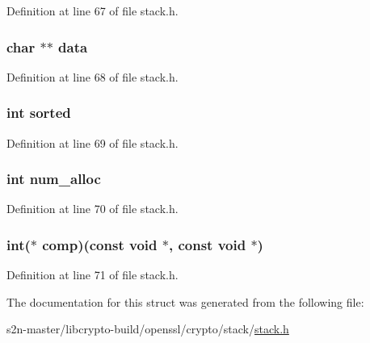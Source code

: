 Definition at line 67 of file stack.\+h.

\subsubsection[{\texorpdfstring{data}{data}}]{\setlength{\rightskip}{0pt plus 5cm}char $\ast$$\ast$ data}\hypertarget{structstack__st_a4abb3a814e075556aea26c8a8e63ea79}{}\label{structstack__st_a4abb3a814e075556aea26c8a8e63ea79}


Definition at line 68 of file stack.\+h.

\subsubsection[{\texorpdfstring{sorted}{sorted}}]{\setlength{\rightskip}{0pt plus 5cm}int sorted}\hypertarget{structstack__st_a96871ce32e4123693134ec578d5462ff}{}\label{structstack__st_a96871ce32e4123693134ec578d5462ff}


Definition at line 69 of file stack.\+h.

\subsubsection[{\texorpdfstring{num\+\_\+alloc}{num_alloc}}]{\setlength{\rightskip}{0pt plus 5cm}int num\+\_\+alloc}\hypertarget{structstack__st_a335194b9069e65772ac2fccb468e271c}{}\label{structstack__st_a335194b9069e65772ac2fccb468e271c}


Definition at line 70 of file stack.\+h.

\subsubsection[{\texorpdfstring{comp}{comp}}]{\setlength{\rightskip}{0pt plus 5cm}int($\ast$ comp)(const {\bf void} $\ast$, const {\bf void} $\ast$)}\hypertarget{structstack__st_a07255e7a23fa92d3bc16c5560e317153}{}\label{structstack__st_a07255e7a23fa92d3bc16c5560e317153}


Definition at line 71 of file stack.\+h.



The documentation for this struct was generated from the following file\+:\begin{DoxyCompactItemize}
\item 
s2n-\/master/libcrypto-\/build/openssl/crypto/stack/\hyperlink{crypto_2stack_2stack_8h}{stack.\+h}\end{DoxyCompactItemize}
